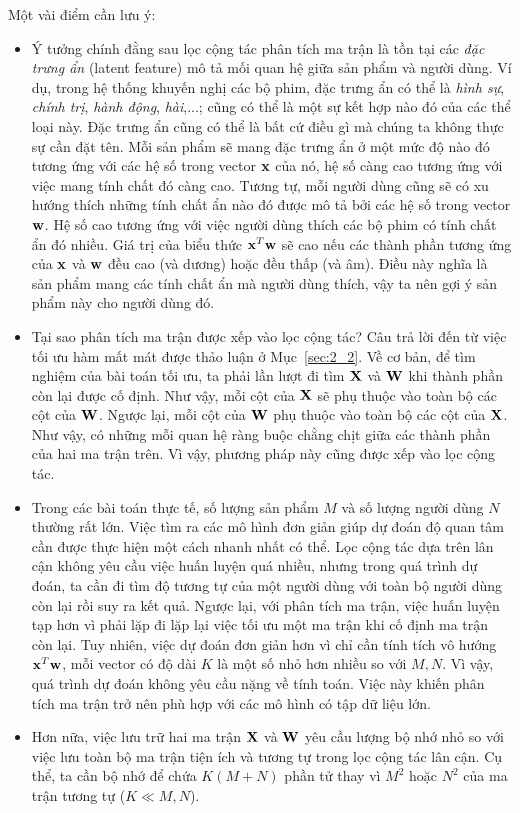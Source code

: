 Một vài điểm cần lưu ý:
\begin{itemize}
\item Ý tưởng chính đằng sau lọc cộng tác phân tích ma trận
là tồn tại các \textit{đặc trưng ẩn} ({latent feature}) mô tả mối quan hệ
giữa sản phẩm và người dùng. Ví dụ, trong hệ thống khuyến nghị các bộ phim,
đặc trưng ẩn có thể là \textit{hình sự}, \textit{chính trị}, \textit{hành
động}, \textit{hài},...; cũng có thể là một sự kết hợp nào đó của các thể
loại này. Đặc trưng ẩn cũng có thể là bất cứ điều gì mà chúng ta không thực
sự cần đặt tên. Mỗi sản phẩm sẽ mang đặc trưng ẩn ở một mức độ nào đó tương
ứng với các hệ số trong vector $\mathbf{x}$ của nó, hệ số càng cao tương ứng với
việc mang tính chất đó càng cao. Tương tự, mỗi người dùng cũng sẽ có xu
hướng thích những tính chất ẩn nào đó được mô tả bởi các hệ số trong
vector $\mathbf{w}$. Hệ số cao tương ứng với việc người dùng thích các bộ phim có
tính chất ẩn đó nhiều. Giá trị của biểu thức $\mathbf{x}^T\mathbf{w}$ sẽ cao nếu các thành phần
tương ứng của $\mathbf{x}$ và $\mathbf{w}$ đều cao (và dương) hoặc đều thấp (và âm). Điều này nghĩa là sản phẩm
mang các tính chất ẩn mà người dùng thích, vậy ta nên gợi ý sản phẩm này cho
người dùng đó.

\item Tại sao phân tích ma trận được xếp vào lọc cộng tác?
Câu trả lời đến từ việc tối ưu hàm mất mát được thảo luận ở
Mục~\ref{sec:2_2}. Về cơ bản, để tìm nghiệm của bài toán tối ưu, ta phải lần
lượt đi tìm $\mathbf{X}$ và $\mathbf{W}$ khi thành phần còn lại được cố
định. Như vậy, mỗi cột của $\mathbf{X}$ sẽ phụ thuộc vào toàn bộ các cột
của $\mathbf{W}$. Ngược lại, mỗi cột của $\mathbf{W}$ phụ thuộc vào
toàn bộ các cột của $\mathbf{X}$. Như vậy, có những mỗi quan hệ ràng buộc
{chằng chịt} giữa các thành phần của hai ma trận trên. Vì vậy, phương pháp này
cũng được xếp vào lọc cộng tác.

\item Trong các bài toán thực tế, số lượng sản phẩm $M$ và số lượng
người dùng $N$ thường rất lớn. Việc tìm ra các mô hình đơn giản giúp dự
đoán độ quan tâm cần được thực hiện một cách nhanh nhất có thể.
Lọc cộng tác dựa trên lân cận không yêu cầu việc huấn luyện quá
nhiều, nhưng trong quá trình dự đoán, ta cần đi tìm độ tương tự của một người dùng với toàn bộ
người dùng còn lại rồi suy ra kết quả. Ngược lại, với phân tích ma trận, việc huấn luyện tạp hơn vì phải
lặp đi lặp lại việc tối ưu một ma trận khi cố định ma trận còn lại. Tuy nhiên,
việc dự đoán đơn giản hơn vì chỉ cần tính tích vô hướng
$\mathbf{x}^T\mathbf{w}$, mỗi vector có độ dài $K$ là một số nhỏ hơn nhiều so với
$M, N$. Vì vậy, quá trình dự đoán không yêu cầu nặng về tính toán. Việc này khiến phân tích ma trận trở nên phù hợp với các mô hình có tập dữ liệu lớn.

\item Hơn nữa, việc lưu trữ hai ma trận $\mathbf{X}$ và $\mathbf{W}$ yêu
cầu lượng bộ nhớ nhỏ so với việc lưu toàn bộ ma trận tiện ích và
tương tự trong lọc cộng tác lân cận. Cụ thể, ta cần
bộ nhớ để chứa $K(M+N)$ phần tử thay vì $M^2$ hoặc $N^2$ của ma trận
tương tự ($K \ll M, N$).
\end{itemize}



